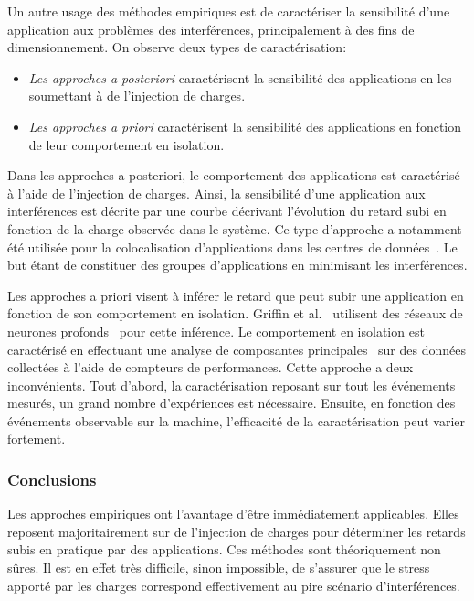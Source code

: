 Un autre usage des méthodes empiriques est de caractériser la sensibilité d'une application aux problèmes des interférences, principalement à des fins de dimensionnement.
On observe deux types de caractérisation:
\begin{itemize}
	\item \emph{Les approches a posteriori} caractérisent la sensibilité des applications en les soumettant à de l'injection de charges. 
	\item \emph{Les approches a priori} caractérisent la sensibilité des applications en fonction de leur comportement en isolation.
\end{itemize}

Dans les approches a posteriori, le comportement des applications est caractérisé à l'aide de l'injection de charges.
Ainsi, la sensibilité d'une application aux interférences est décrite par une courbe décrivant l'évolution du retard subi en fonction de la charge observée dans le système.
Ce type d'approche a notamment été utilisée pour la colocalisation d'applications dans les centres de données~\cite{mars2011bubble,black2013bandwidth,215971,zhao2016predicting,zhao2015predicting}.
Le but étant de constituer des groupes d'applications en minimisant les interférences.


Les approches a priori visent à inférer le retard que peut subir une application en fonction de son comportement en isolation.
Griffin et al.~\cite{griffin2017forecast} utilisent des réseaux de neurones profonds~\cite{lecun2015deep} pour cette inférence.
Le comportement en isolation est caractérisé en effectuant une analyse de composantes principales~\cite{wold1987principal} sur des données collectées à l'aide de compteurs de performances.
Cette approche a deux inconvénients.
Tout d'abord, la caractérisation reposant sur tout les événements mesurés, un grand nombre d'expériences est nécessaire.
Ensuite, en fonction des événements observable sur la machine, l'efficacité de la caractérisation peut varier fortement.

\subsubsection{Conclusions}

Les approches empiriques ont l'avantage d'être immédiatement applicables.
Elles reposent majoritairement sur de l'injection de charges pour déterminer les retards subis en pratique par des applications.
Ces méthodes sont théoriquement non sûres.
Il est en effet très difficile, sinon impossible, de s'assurer que le stress apporté par les charges correspond effectivement au pire scénario d'interférences.

